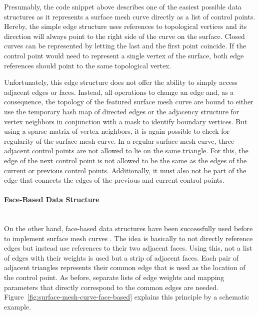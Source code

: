 \documentclass{stdlocal}
\begin{document}
  Presumably, the code snippet above describes one of the easiest possible data structures as it represents a surface mesh curve directly as a list of control points.
  Hereby, the simple edge structure uses references to topological vertices and its direction will always point to the right side of the curve on the surface.
  Closed curves can be represented by letting the last and the first point coincide.
  If the control point would need to represent a single vertex of the surface, both edge references should point to the same topological vertex.

  Unfortunately, this edge structure does not offer the ability to simply access adjacent edges or faces.
  Instead, all operations to change an edge and, as a consequence, the topology of the featured surface mesh curve are bound to either use the temporary hash map of directed edges or the adjacency structure for vertex neighbors in conjunction with a mask to identify boundary vertices.
  But using a sparse matrix of vertex neighbors, it is again possible to check for regularity of the surface mesh curve.
  In a regular surface mesh curve, three adjacent control points are not allowed to lie on the same triangle.
  For this, the edge of the next control point is not allowed to be the same as the edges of the current or previous control points.
  Additionally, it must also not be part of the edge that connects the edges of the previous and current control points.

  \paragraph{Face-Based Data Structure}\hfill\\
  On the other hand, face-based data structures have been successfully used before to implement surface mesh curves \autocite{mancinelli2022}.
  The idea is basically to not directly reference edges but instead use references to their two adjacent faces.
  Using this, not a list of edges with their weights is used but a strip of adjacent faces.
  Each pair of adjacent triangles represents their common edge that is used as the location of the control point.
  As before, separate lists of edge weights and mapping parameters that directly correspond to the common edges are needed.
  Figure~\ref{fig:surface-mesh-curve-face-based} explains this principle by a schematic example.
\end{document}
